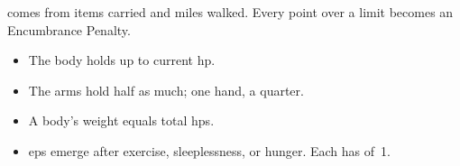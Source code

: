 \subsubsection*{}
comes from items carried and miles walked.
Every point over a limit becomes an Encumbrance Penalty.

\begin{itemize}
  \item
  The body holds  up to current \gls{hp}.
  \item
  The arms hold half as much; one hand, a quarter.
  \item
  A body's \gls{weight} equals total \glspl{hp}.
  \item
  \Glspl{ep} emerge after exercise, sleeplessness, or hunger.
  Each has  of~1.
\end{itemize}
